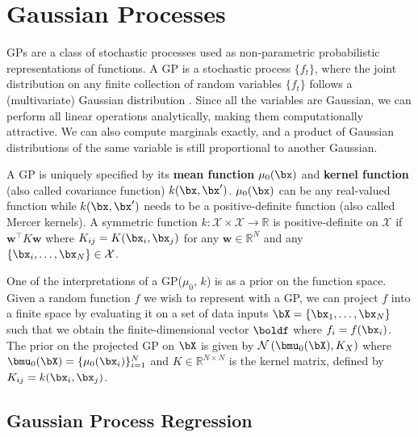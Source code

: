 \section{Gaussian Processes}
\label{sec:gps}

\acf{GPs} are a class of stochastic processes used as non-parametric probabilistic representations of functions.
A \ac{GP} is a stochastic process $\{f_t\}$, where the joint distribution on any finite collection of random variables $\{f_t\}$ follows a (multivariate) Gaussian distribution \cite{rasmussen2006gaussian}.
Since all the variables are Gaussian, we can perform all linear operations analytically, making them computationally attractive.
We can also compute marginals exactly, and a product of Gaussian distributions of the same variable is still proportional to another Gaussian.

A \ac{GP} is uniquely specified by its \textbf{mean function} $\mu_0(\bx)$ and \textbf{kernel function} (also called covariance function) $k(\bx, \bx')$.
$\mu_0(\bx)$ can be any real-valued function while $k(\bx, \bx')$ needs to be a positive-definite function (also called Mercer kernels).
A symmetric function $k:\mathcal{X}\times\mathcal{X}\rightarrow \mathbb{R} $ is positive-definite on $\mathcal{X}$ if $\boldsymbol{w}^\top K \boldsymbol{w}$ where $K_{ij} = K(\bx_i,\bx_j)$ for any $\boldsymbol{w}\in\mathbb{R}^N$ and any $\{\bx_i,\ldots,\bx_N\} \in \mathcal{X}$.

One of the interpretations of a \ac{GP}($\mu_0$, $k$) is as a prior on the function space.
Given a random function $f$ we wish to represent with a \ac{GP}, we can project $f$ into a finite space by evaluating it on a set of data inputs $\bX = \{\bx_1, \ldots, \bx_N\}$ such that we obtain the finite-dimensional vector $\boldf$ where $f_i = f(\bx_i)$.
The prior on the projected \ac{GP} on $\bX$ is given by $\mathcal{N}\left(\bmu_0(\bX), K_{X}\right)$ where $\bmu_0(\bX) = \{\mu_0(\bx_i)\}_{i=1}^N$ and $K \in \mathbb{R}^{N\times N}$ is the kernel matrix, defined by $K_{ij} = k(\bx_i, \bx_j)$.

\subsection{Gaussian Process Regression}

